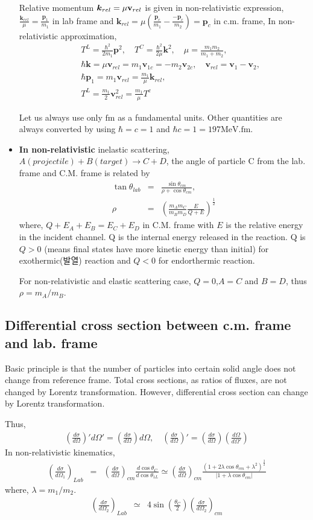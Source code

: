 \documentclass[10pt]{book}
\def\bm{\boldsymbol}
\newcommand{\bea}{\begin{eqnarray}}
\newcommand{\eea}{\end{eqnarray}}
\newcommand{\no}{\nonumber \\}
\def\vp{{\bm p}}
\def\vk{{\bm k}}
\begin{document}
\begin{itemize}
Relative momentum $\vk_{rel}=\mu{\bf v}_{rel}$ 
is given in non-relativistic expression,
$\frac{\vk_{rel}}{\mu}=\frac{\vp_1}{m_1}$ in lab frame
and 
$\vk_{rel}=\mu(\frac{\vp_c}{m_1}-\frac{-\vp_c}{m_2})=\vp_c$
in c.m. frame, 
In non-relativistic approximation,
\bea
& &T^L=\frac{\hbar^2}{2m_1}\vp^2,\quad T^C=\frac{\hbar^2}{2\mu}\vk^2,
\quad \mu=\frac{m_1 m_2}{m_1+m_2},\no
& & \hbar\vk=\mu{\bm v}_{rel}=m_1{\bm v}_{1c}=-m_2{\bm v}_{2c},
\quad {\bm v}_{rel}={\bm v}_1-{\bm v}_2,\no 
& &\hbar{\vp}_1=m_1{\bm v}_{rel}=\frac{m_1}{\mu}\vk_{rel} ,
\no
& &
 T^L=\frac{m_1}{2}{\bm v}_{rel}^2=\frac{m_1}{\mu}T^c
\eea

Let us always use only $\mbox{fm}$ as a fundamental units.
Other quantities are always converted by using
$\hbar=c=1$ and $\hbar c=1=197 \mbox{MeV}.\mbox{fm}$.

\item 
{\bf In non-relativistic} inelastic scattering, $A(projectile)+B(target)\to C+D$,
the angle of particle C from the lab. frame and C.M. frame is related by
\bea
\tan\theta_{lab}&=&\frac{\sin\theta_{cm}}{\rho+\cos\theta_{cm}},\no
\rho&=&\left(\frac{m_A m_C}{m_B m_D}\frac{E}{Q+E}\right)^{\frac{1}{2}}
\eea
where, $Q+E_A+E_B=E_C+E_D$ in C.M. frame
with $E$ is the relative energy in the incident channel.
Q is the internal energy released in the reaction.
Q is $Q>0$
(means final states have more kinetic energy than initial) 
for exothermic(발열) reaction and
$Q<0$ for endorthermic reaction.
 
For non-relativistic and elastic scattering case, 
$Q=0$,$A=C$ and $B=D$, thus
$\rho=m_A/m_B$.
\end{itemize}

\subsection{Differential cross section between c.m. frame and lab. frame}

Basic principle is that the number of particles 
into certain solid angle does not change from reference frame.
Total cross sections, as ratios of fluxes, are not changed by Lorentz transformation.
However, differential cross section can change by Lorentz transformation.

Thus,
\bea
\left(\frac{d\sigma}{d\Omega}\right)' d\Omega'
=\left(\frac{d\sigma}{d\Omega}\right) d\Omega,\quad
\left(\frac{d\sigma}{d\Omega}\right)'=\left(\frac{d\sigma}{d\Omega}\right)
 \left(\frac{d\Omega}{d\Omega'}\right)
\eea
In non-relativistic kinematics,
\bea
\left(\frac{d\sigma}{d\Omega_1}\right)_{Lab}
&=&\left(\frac{d\sigma}{d\Omega}\right)_{cm}
    \frac{d\cos\theta_{C}}{d\cos\theta_{1L}}
  \simeq \left(\frac{d\sigma}{d\Omega}\right)_{cm} 
  \frac{(1+2\lambda \cos\theta_{cm}+\lambda^2)^{\frac{3}{2}}}
   {|1+\lambda \cos\theta_{cm}|}
\eea
where, $\lambda=m_1/m_2$.
\bea
\left(\frac{d\sigma}{d\Omega_2}\right)_{Lab}
&\simeq&4\sin(\frac{\theta_C}{2})\left(\frac{d\sigma}{d\Omega_2}\right)_{cm}
\eea
\end{document}

